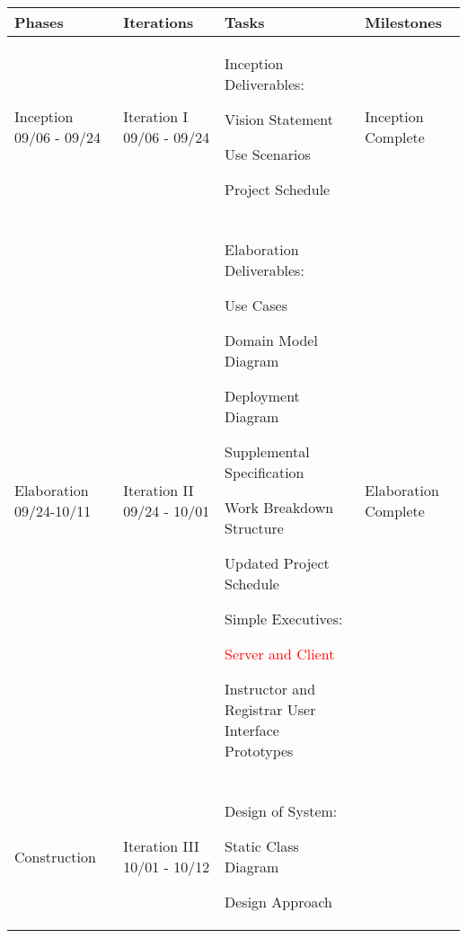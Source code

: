\documentclass[11pt]{article}
\newenvironment{packed_itemize}{
\begin{itemize}
  \setlength{\itemsep}{1pt}
  \setlength{\parskip}{0pt}
  \setlength{\parsep}{0pt}
}{\end{itemize}}
\begin{document}
\begin{table}
\centering %
\begin{tabular}{|p{0.9in}|p{0.9in}|p{3.2in}|p{.9in}|}
\hline
\textbf{Phases}  & \textbf{Iterations}  & \textbf{Tasks}        & \textbf{Milestones} \\
\hline\hline
 Inception 09/06 - 09/24
   &  Iteration I 09/06 - 09/24  
	& Inception Deliverables:
	 \begin{packed_itemize} 
	\vspace{-0.15in}
		\item Vision Statement
		\item Use Scenarios
		\item Project Schedule
	\end{packed_itemize}
	\vspace{-0.4in}
	& Inception Complete\\
   &        & & \\
\hline
Elaboration 09/24-10/11& 
Iteration II 09/24 - 10/01& 
Elaboration Deliverables: 
	 \begin{packed_itemize} 
	\vspace{-0.15in}
		\item Use Cases
		\item Domain Model Diagram
		\item Deployment Diagram
		\item Supplemental Specification
		\item Work Breakdown Structure
		\item Updated Project Schedule
   \end{packed_itemize}

Simple Executives:
	\begin{packed_itemize}
		\vspace{-0.15in}
		\item \textcolor{red}{Server and Client}
		\item Instructor and Registrar User Interface Prototypes
	\end{packed_itemize}
   \vspace{-0.4in}
& Elaboration Complete
\\
& & & \\
\hline

\multirow{20}{*}{Construction }
 &
 Iteration III 10/01 - 10/12 &
 Design of System:
	\begin{packed_itemize}
		\vspace{-0.15in}
		\item Static Class Diagram
		\item Design Approach
	\end{packed_itemize}


\end{tabular}
\end{table}
\end{document}
